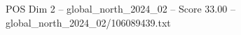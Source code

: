 \begin{textsample}{POS Dim 2 – global\_north\_2024\_02 – Score 33.00 – global\_north\_2024\_02/106089439.txt}
\end{textsample}
